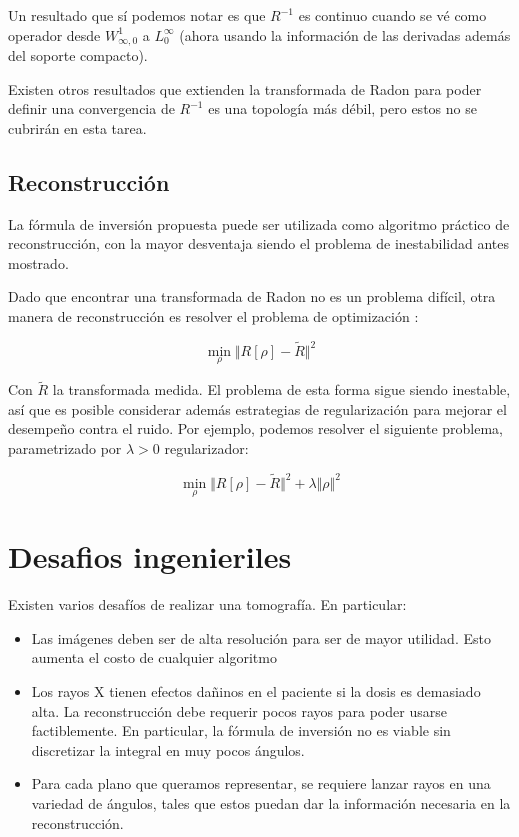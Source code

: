 Un resultado que sí podemos notar es que $R^{-1}$ es continuo cuando se vé como operador desde $W_{\infty, 0}^1$ a $L_0^\infty$ (ahora usando la información de las derivadas además del soporte compacto). 

Existen otros resultados que extienden la transformada de Radon para poder definir una convergencia de $R^{-1}$ es una topología más débil, pero estos no se cubrirán en esta tarea.

\subsection{Reconstrucción}
La fórmula de inversión propuesta puede ser utilizada como algoritmo práctico de reconstrucción, con la mayor desventaja siendo el problema de inestabilidad antes mostrado. 

Dado que encontrar una transformada de Radon no es un problema difícil, otra manera de reconstrucción es resolver el problema de optimización \citep{candes_opti}:

\[
\min_{\rho}\Vert R[\rho] - \tilde{R}\Vert^2
\]

Con $\tilde{R}$ la transformada medida. El problema de esta forma sigue siendo inestable, así que es posible considerar además estrategias de regularización para mejorar el desempeño contra el ruido. Por ejemplo, podemos resolver el siguiente problema, parametrizado por $\lambda>0$ regularizador:

\[
\min_{\rho}\Vert R[\rho] - \tilde{R}\Vert^2 + \lambda \Vert \rho\Vert^2
\]

\section{Desafios ingenieriles}
Existen varios desafíos de realizar una tomografía. En particular:
\begin{itemize}
    \item Las imágenes deben ser de alta resolución para ser de mayor utilidad. Esto aumenta el costo de cualquier algoritmo
    \item Los rayos X tienen efectos dañinos en el paciente si la dosis es demasiado alta. La reconstrucción debe requerir pocos rayos para poder usarse factiblemente. En particular, la fórmula de inversión no es viable sin discretizar la integral en muy pocos ángulos. \citep{herman_2012}
    \item Para cada plano que queramos representar, se requiere lanzar rayos en una variedad de ángulos, tales que estos puedan dar la información necesaria en la reconstrucción.
\end{itemize}

